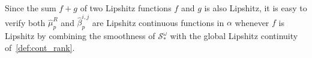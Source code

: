 \documentclass[10pt]{article}
\numberwithin{equation}{section}
\newcommand{\+}{%
	\raisebox{0.18ex}{\scaleobj{0.55}{+}}
}
\theoremstyle{definition}
\theoremstyle{definition}
\begin{document}
\noindent Since the sum $f + g$ of two Lipshitz functions $f$ and $g$ is also Lipshitz, it is easy to verify both $\hat{\mu}_p^R$ and $\hat{\beta}_p^{i,j}$ are Lipshitz continuous functions in $\alpha$ whenever $f$ is Lipshitz by combining the smoothness of $\mathcal{S}_\ast^\omega$ with the global Lipshitz continuity of~\eqref{def:cont_rank}. 
%

%
\end{document}
